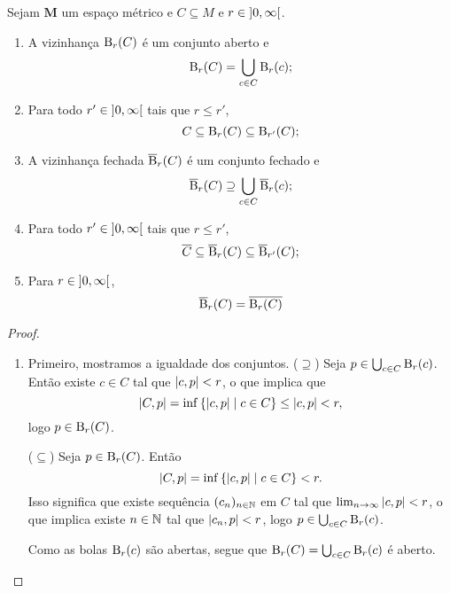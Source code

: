 \begin{exercise}
Sejam $\bm M$ um espaço métrico e $C \subseteq M$ e $r \in \left]{0},{\infty}\right[$.
	\begin{enumerate}
	\item A vizinhança $\mathrm{B}_r(C) $ é um conjunto aberto e
		\begin{equation*}
		\mathrm{B}_r(C) = \bigcup_{c \in C} \mathrm{B}_r(c);
		\end{equation*}
	\item  Para todo $r' \in \left]{0},{\infty}\right[$ tais que $r \leq r'$,
		\begin{equation*}
		C \subseteq \mathrm{B}_r(C) \subseteq \mathrm{B}_{r'}(C);
		\end{equation*}
	\item A vizinhança fechada $\overline{\mathrm{B}}_r(C) $ é um conjunto fechado e
		\begin{equation*}
		\overline{\mathrm{B}}_r(C) \supseteq \bigcup_{c \in C} \overline{\mathrm{B}}_r(c);
		\end{equation*}
	\item  Para todo $r' \in \left]{0},{\infty}\right[$ tais que $r \leq r'$,
		\begin{equation*}
		\overline{C} \subseteq \overline{\mathrm{B}}_r(C) \subseteq \overline{\mathrm{B}}_{r'}(C);
		\end{equation*}
	\item Para $r \in \left]{0},{\infty}\right[$,
		\begin{equation*}
		\overline{\mathrm{B}}_r(C) = \overline{\mathrm{B}_r(C)}
		\end{equation*}
	\end{enumerate}
\end{exercise}
\begin{proof}
	\begin{enumerate}
	\item Primeiro, mostramos a igualdade dos conjuntos. ($\supseteq$) Seja $p \in \bigcup_{c \in C} \mathrm{B}_r(c)$. Então existe $c \in C$ tal que $\left\vert{c},{p}\right\vert < r$, o que implica que
	\begin{equation*}
	\left\vert{C},{p}\right\vert = \inf \left\{{\left\vert{c},{p}\right\vert}\;\middle\vert\;{c \in C}\right\} \leq \left\vert{c},{p}\right\vert < r,
	\end{equation*}
logo $p \in \mathrm{B}_r(C)$.

($\subseteq$) Seja $p \in \mathrm{B}_r(C)$. Então
	\begin{equation*}
	\left\vert{C},{p}\right\vert = \inf \left\{{\left\vert{c},{p}\right\vert}\;\middle\vert\;{c \in C}\right\} < r.
	\end{equation*}
Isso significa que existe sequência $(c_n)_{n \in \mathbb{N}}$ em $C$ tal que $\lim_{n \rightarrow \infty} \left\vert{c},{p}\right\vert < r$, o que implica existe $n \in \mathbb{N}$ tal que $\left\vert{c_n},{p}\right\vert<r$, logo $p \in \bigcup_{c \in C} \mathrm{B}_r(c)$.

Como as bolas $\mathrm{B}_r(c)$ são abertas, segue que $\mathrm{B}_r(C) = \bigcup_{c \in C} \mathrm{B}_r(c)$ é aberto.
	\end{enumerate}
\end{proof}

